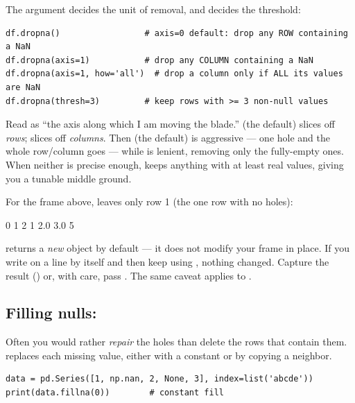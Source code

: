 \documentclass[11pt]{article}
\begin{document}
The  argument decides the unit of removal, and  decides the threshold:

\begin{lstlisting}
df.dropna()                 # axis=0 default: drop any ROW containing a NaN
df.dropna(axis=1)           # drop any COLUMN containing a NaN
df.dropna(axis=1, how='all')  # drop a column only if ALL its values are NaN
df.dropna(thresh=3)         # keep rows with >= 3 non-null values
\end{lstlisting}

\begin{intuition}
Read  as ``the axis along which I am moving the blade.''  (the default) slices off \emph{rows};  slices off \emph{columns}. Then  (the default) is aggressive --- one hole and the whole row/column goes --- while  is lenient, removing only the fully-empty ones. When neither is precise enough,  keeps anything with at least  real values, giving you a tunable middle ground.
\end{intuition}

For the frame above,  leaves only row 1 (the one row with no holes):

\begin{outblock}
     0    1  2
1  2.0  3.0  5
\end{outblock}

\begin{pitfall}
 returns a \emph{new} object by default --- it does not modify your frame in place. If you write  on a line by itself and then keep using , nothing changed. Capture the result () or, with care, pass . The same caveat applies to .
\end{pitfall}

\subsection{Filling nulls: }

Often you would rather \emph{repair} the holes than delete the rows that contain them.  replaces each missing value, either with a constant or by copying a neighbor.

\begin{lstlisting}
data = pd.Series([1, np.nan, 2, None, 3], index=list('abcde'))
print(data.fillna(0))        # constant fill
\end{lstlisting}
\end{document}
